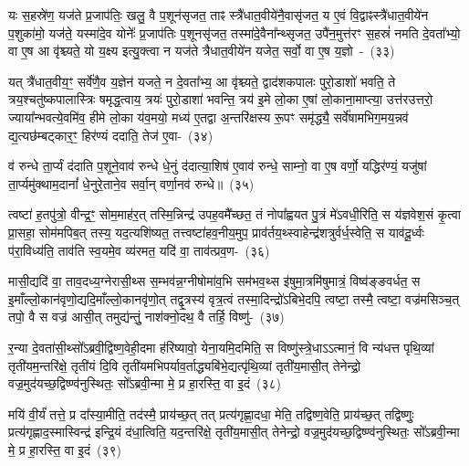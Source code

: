 यः स॒हस्रे॑ण॒ यज॑ते प्र॒जा\-प॑तिः॒ खलु॒ वै प॒शून॑सृजत॒ ताꣴ स्त्रै॑धात॒वीये॑नै॒वासृ॑जत॒ य ए॒वं वि॒द्वाꣴस्त्रै॑धात॒वीये॑न प॒शुका॑मो॒ यज॑ते॒ यस्मा॑दे॒व योनेः᳚ प्र॒जा\-प॑तिः प॒शूनसृ॑जत॒ तस्मा॑दे॒वैना᳚न्थ्सृजत॒ उपै॑न॒मुत्त॑रꣳ स॒हस्रं॑ नमति दे॒वता᳚भ्यो॒ वा ए॒ष आ वृ॑श्च्यते॒ यो य॒क्ष्य इत्यु॒क्त्वा न यज॑ते त्रैधात॒वीये॑न यजेत॒ सर्वो॒ वा ए॒ष य॒ज्ञो~-~(३३)

यत् त्रै॑धात॒वीय॒ꣳ॒ सर्वे॑णै॒व य॒ज्ञेन॑ यजते॒ न दे॒वता᳚भ्य॒ आ वृ॑श्च्यते॒ द्वाद॑श\-कपालः पुरो॒डाशो॑ भवति॒ ते त्रय॒श्चतु॑ष्कपालास्त्रिः षमृद्ध॒त्वाय॒ त्रयः॑ पुरो॒डाशा॑ भवन्ति॒ त्रय॑ इ॒मे लो॒का ए॒षां लो॒काना॒माप्त्या॒ उत्त॑रउत्तरो॒ ज्याया᳚न्भवत्ये॒वमि॑व॒ हीमे लो॒का य॑व॒मयो॒ मध्य॑ ए॒तद्वा अ॒न्तरि॑क्षस्य रू॒पꣳ समृ॑द्ध्यै॒ सर्वे॑षामभिग॒मय॒न्नव॑ द्य॒त्यछ॑म्बट्कार॒ꣳ॒ हिर॑ण्यं ददाति॒ तेज॑ ए॒वा-~(३४)

व॑ रुन्धे ता॒र्प्यं द॑दाति प॒शूने॒वाव॑ रुन्धे धे॒नुं द॑दात्या॒शिष॑ ए॒वाव॑ रुन्धे॒ साम्नो॒ वा ए॒ष वर्णो॒ यद्धिर॑ण्यं॒ यजु॑षां ता॒र्प्यमु॑क्थाम॒दानां᳚ धे॒नुरे॒ताने॒व सर्वा॒न् वर्णा॒नव॑ रुन्धे॥~(३५)

{\anuvakamend[{जग॑त्या\-ऽभि॒चर॒न्थ्सर्वो॒ वै ग॑च्छति य॒ज्ञस्तेज॑ ए॒व त्रि॒ꣳ॒शच्च॑}]}%

त्वष्टा॑ ह॒तपु॑त्रो॒ वीन्द्र॒ꣳ॒ सोम॒माह॑र॒त् तस्मि॒न्निन्द्र॑ उपह॒वमै᳚च्छत॒ तं नोपा᳚ह्वयत पु॒त्रं मे॑\-ऽवधी॒रिति॒ स य॑ज्ञवेश॒सं कृ॒त्वा प्रा॒सहा॒ सोम॑मपिब॒त् तस्य॒ यद॒त्यशि॑ष्यत॒ तत्त्वष्टा॑हव॒नीय॒मुप॒ प्राव॑र्तय॒थ्\-स्वाहेन्द्र॑शत्रुर्वर्ध॒स्वेति॒ स याव॑दू॒र्ध्वः प॑रा॒विध्य॑ति॒ ताव॑ति स्व॒यमे॒व व्य॑रमत॒ यदि॑ वा॒ ताव॑त्प्रव॒ण-~(३६)

मासी॒द्यदि॑ वा॒ ताव॒दध्य॒ग्नेरासी॒थ्स स॒म्भव॑न्न॒ग्नी\-षोमा॑व॒भि सम॑भव॒थ्स इ॑षुमा॒त्रमि॑षुमात्रं॒ विष्व॑ङ्ङवर्धत॒ स इ॒माँल्लो॒कान॑वृणो॒द्य\-दि॒माँल्लो॒कान\-वृ॑णो॒त् तद्वृ॒त्रस्य॑ वृत्र॒त्वं तस्मा॒दिन्द्रो॑\-ऽबिभे॒दपि॒ त्वष्टा॒ तस्मै॒ त्वष्टा॒ वज्र॑मसिञ्च॒त् तपो॒ वै स वज्र॑ आसी॒त् तमुद्य॑न्तुं॒ नाश॑क्नो॒दथ॒ वै तर्\mbox{}हि॒ विष्णु॑-~(३७)

र॒न्या दे॒वता॑सी॒थ्सो᳚\-ऽब्रवी॒द्विष्ण॒वेही॒दमा ह॑रिष्यावो॒ येना॒यमि॒दमिति॒ स विष्णु॑स्त्रे॒धा\-ऽऽ\-त्मानं॒ वि न्य॑धत्त पृथि॒व्यां तृती॑यम॒न्तरि॑क्षे॒ तृती॑यं दि॒वि तृती॑यमभिपर्याव॒र्ताद्ध्यबि॑भे॒द्यत्पृ॑थि॒व्यां तृती॑य॒मासी॒त् तेनेन्द्रो॒ वज्र॒मुद॑यच्छ॒द्विष्ण्व॑नुस्थितः॒ सो᳚\-ऽब्रवी॒न्मा मे॒ प्र हा॒रस्ति॒ वा इ॒दं~(३८)

मयि॑ वी॒र्यं॑ तत्ते॒ प्र दा᳚स्या॒मीति॒ तद॑स्मै॒ प्राय॑च्छ॒त् तत् प्रत्य॑\-गृह्णा॒दधा॒ मेति॒ तद्विष्ण॒वेति॒ प्राय॑च्छ॒त् तद्विष्णुः॒ प्रत्य॑\-गृह्णाद॒स्मास्विन्द्र॑ इन्द्रि॒यं द॑धा॒त्विति॒ यद॒न्तरि॑क्षे॒ तृती॑य॒मासी॒त् तेनेन्द्रो॒ वज्र॒मुद॑यच्छ॒द्विष्ण्व॑नुस्थितः॒ सो᳚\-ऽब्रवी॒न्मा मे॒ प्र हा॒रस्ति॒ वा इ॒दं~(३९)

